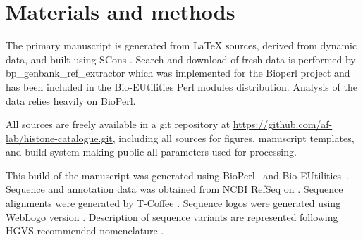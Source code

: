 \section{Materials and methods}

  The primary manuscript is generated from \LaTeX{} sources, derived
  from dynamic data, and built using SCons \citep{SCons2005}.
  Search and download of fresh data is performed by bp\_genbank\_ref\_extractor
  which was implemented for the Bioperl project \citep{bioperl} and has
  been included in the Bio-EUtilities Perl modules distribution.
  Analysis of the data relies
  heavily on BioPerl.

  All sources are freely available in a git repository at
  \url{https://github.com/af-lab/histone-catalogue.git}, including all
  sources for figures, manuscript templates, and build system making public
  all parameters used for processing.

  This build of the manuscript was generated using BioPerl~\BioPerlVersion{}
  and Bio-EUtilities~\BioEUtilitiesVersion{}.
  Sequence and annotation data was obtained from NCBI RefSeq \citep{OLearyRefseq2016}
  on \printdate{\SequencesDate{}}.
  Sequence alignments were generated by T-Coffee \TCoffeVersion{} \citep{tcoffee2000}.
  Sequence logos were generated using WebLogo version \WebLogoVersion{} \citep{weblogo}.
  Description of sequence variants are represented following HGVS
  recommended nomenclature \citep{mutnomenclature2016}.
